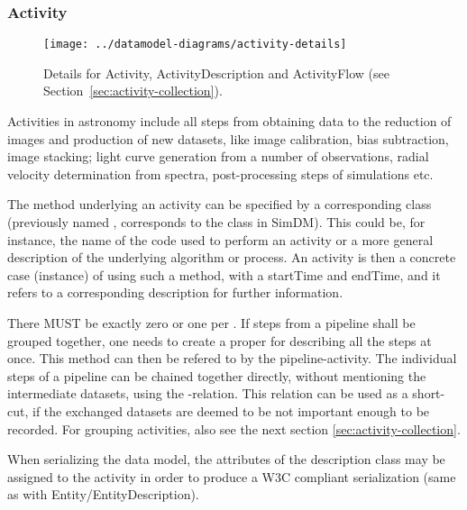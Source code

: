\subsubsection{Activity}

\begin{figure}[h]
\centering
\texttt{[image: ../datamodel-diagrams/activity-details]}
\caption{Details for Activity, ActivityDescription and ActivityFlow (see Section~\ref{sec:activity-collection}). 
}
\label{fig:activity-details}
\end{figure}


Activities in astronomy include all steps from obtaining data to the reduction of 
images and production of new datasets, like image calibration, bias subtraction, image stacking; 
light curve generation from a number of observations, radial velocity 
determination from spectra, post-processing steps of simulations etc.

The method underlying an activity can be specified by a corresponding 
 class (previously named , corresponds 
to the  class in SimDM). This could be, 
for instance, the name of the code used to perform an activity or a more general 
description of the underlying algorithm or process. An activity is then a 
concrete case (instance) of using such a method, with a startTime and endTime, 
and it refers to a corresponding description for further information.

There MUST be exactly zero or one  per . If steps from a 
pipeline shall be grouped together, one needs to create a proper 
 for describing all the steps at once. This method can then 
be refered to by the pipeline-activity. 
The individual steps of a pipeline can be chained
together directly, without mentioning the intermediate datasets, using the -relation.
This relation can be used as a short-cut, if the exchanged datasets are deemed to be not important
enough to be recorded.
For grouping activities, also see the 
next section \ref{sec:activity-collection}.

When serializing the data model, the attributes
of the description class may be assigned to the activity in order to produce 
a W3C compliant serialization (same as with Entity/EntityDescription).

